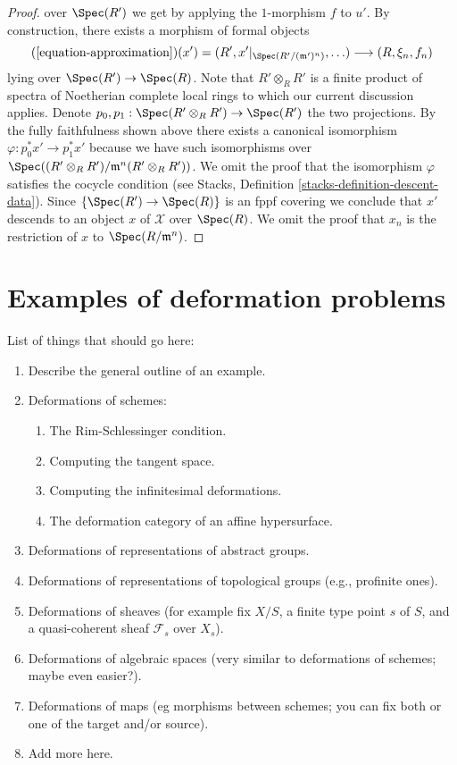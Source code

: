 \begin{proof}
over $\Spec(R')$ we get by applying the $1$-morphism $f$ to $u'$.
By construction, there exists a morphism of formal objects
$$
(\ref{equation-approximation})(x') =
(R', x'|_{\Spec(R'/(\mathfrak m')^n)}, \ldots)
\longrightarrow
(R, \xi_n, f_n)
$$
lying over $\Spec(R') \to \Spec(R)$. Note that $R' \otimes_R R'$ is a finite
product of spectra of Noetherian complete local rings to which our current
discussion applies. Denote $p_0, p_1 : \Spec(R' \otimes_R R') \to \Spec(R')$
the two projections. By the fully faithfulness shown above there exists
a canonical isomorphism $\varphi : p_0^*x' \to p_1^*x'$ because we have
such isomorphisms over
$\Spec((R' \otimes_R R')/\mathfrak m^n(R' \otimes_R R'))$.
We omit the proof that the isomorphism $\varphi$ satisfies the cocycle
condition (see Stacks, Definition \ref{stacks-definition-descent-data}).
Since $\{\Spec(R') \to \Spec(R)\}$ is an fppf covering we conclude
that $x'$ descends to an object $x$ of $\mathcal{X}$ over $\Spec(R)$.
We omit the proof that $x_n$ is the restriction of $x$ to
$\Spec(R/\mathfrak m^n)$.
\end{proof}





\section{Examples of deformation problems}
\label{section-examples}

\noindent
List of things that should go here:
\begin{enumerate}
\item Describe the general outline of an example.
\item Deformations of schemes:
\begin{enumerate}
\item The Rim-Schlessinger condition.
\item Computing the tangent space.
\item Computing the infinitesimal deformations.
\item The deformation category of an affine hypersurface.
\end{enumerate}
\item Deformations of representations of abstract groups.
\item Deformations of representations of topological groups
(e.g., profinite ones).
\item Deformations of sheaves (for example fix $X/S$, a finite type point
$s$ of $S$, and a quasi-coherent sheaf $\mathcal{F}_s$ over $X_s$).
\item Deformations of algebraic spaces (very similar to deformations
of schemes; maybe even easier?).
\item Deformations of maps (eg morphisms between schemes; you can fix
both or one of the target and/or source).
\item Add more here.
\end{enumerate}
















